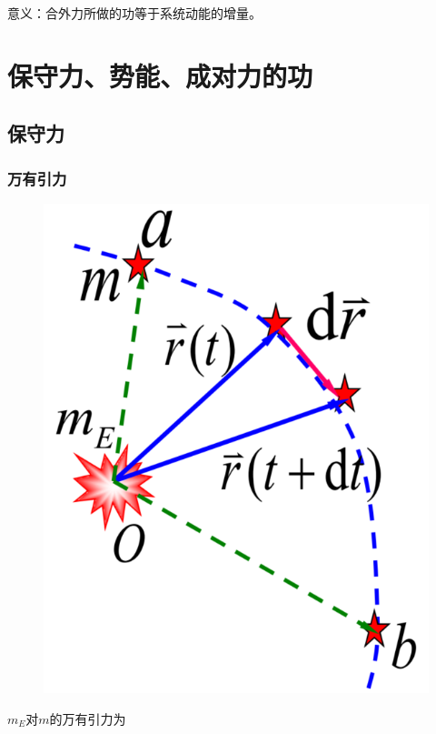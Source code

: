 \documentclass[
	12pt, %
	a4paper, %
]{myLegrandOrangeBook}
\begin{document}
意义：合外力所做的功等于系统动能的增量。

\section{保守力、势能、成对力的功}

\subsection{保守力}

\subsubsection{万有引力}

\begin{figure}
    \centering
    \includegraphics[scale=0.2]{"Chapter 03 images/pic4.png"}
    \label{pic4}
\end{figure}

\(m_{E}\)对\(m\)的万有引力为
\end{document}
